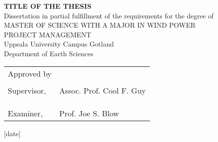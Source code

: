 
\thispagestyle{empty}

\vspace*{+5em}
\begin{center}
\textbf{TITLE OF THE THESIS}\\
\vspace*{+4em}
Dissertation in partial fulfillment of the requirements for the degree of\\
\vspace{+2em}
MASTER OF SCIENCE WITH A MAJOR IN WIND POWER\\
PROJECT MANAGEMENT\\

\vspace*{+3em}
Uppsala University Campus Gotland\\
Department of Earth Sciences\\
\vspace*{+2em}

\end{center}

\begin{tabular}{ l l }
 Approved by &   \\
  & \\
  Supervisor, & Assoc. Prof. Cool F. Guy \\ 
  & \\
  & \\
  & \\
 Examiner, & Prof. Joe S. Blow \\ 
\end{tabular}

\vspace*{+4em}

\begin{center}
[date]
\end{center}

